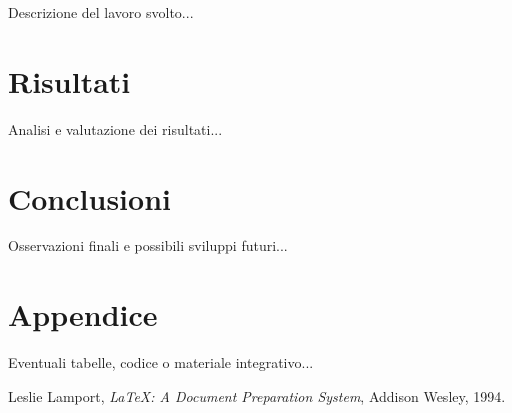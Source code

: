 \documentclass[a4paper,12pt]{report}
\begin{document}
    Descrizione del lavoro svolto...

    \chapter{Risultati}

    Analisi e valutazione dei risultati...

    \chapter{Conclusioni}

    Osservazioni finali e possibili sviluppi futuri...

    \appendix
    \chapter{Appendice}

    Eventuali tabelle, codice o materiale integrativo...

    \clearpage
    \begin{thebibliography}{9}

        Leslie Lamport,
        \textit{LaTeX: A Document Preparation System},
        Addison Wesley, 1994.


    \end{thebibliography}
\end{document}
